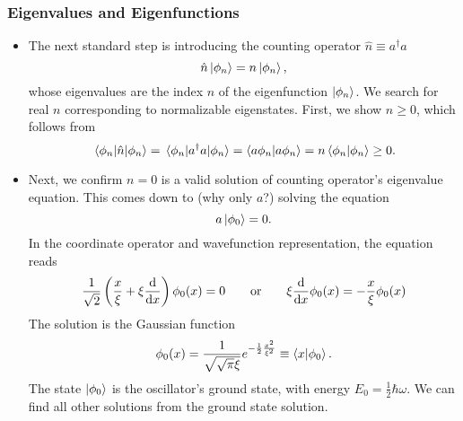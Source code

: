 \documentclass[11pt, a4paper]{article}
\newcommand{\eqtext}[1]{\qquad \text{#1} \qquad}
\renewcommand{\k}[1]{\ket{#1}}
\begin{document}
\subsubsection{Eigenvalues and Eigenfunctions}
\begin{itemize}
	\item The next standard step is introducing the counting operator $ \hat{n} \equiv a^{\dagger}a $
	\begin{equation*}
		\hat{n}\k{\phi_{n}} = n \ket{\phi_{n}},
	\end{equation*}
	whose eigenvalues are the index $ n $ of the eigenfunction $ \ket{\phi_{n}} $. We search for real $ n $ corresponding to normalizable eigenstates. First, we show $ n \geq 0 $, which follows from
	\begin{equation*}
		\mel{\phi_{n}}{\hat{n}}{\phi_{n}} = \mel{\phi_{n}}{a^{\dagger}a}{\phi_{n}} = \braket{a \phi_{n}}{a \phi_{n}} = n \braket{\phi_{n}}{\phi_{n}} \geq 0.
	\end{equation*}
	
	\item Next, we confirm $ n = 0 $ is a valid solution of counting operator's eigenvalue equation. This comes down to (why only $ a $?) solving the equation
	\begin{equation*}
		a \ket{\phi_{0}} = 0.
	\end{equation*}
	In the coordinate operator and wavefunction representation, the equation reads
	\begin{equation*}
		\frac{1}{\sqrt{2}}\left(\frac{x}{\xi} + \xi \dv{x}\right)\phi_{0}(x) = 0 \eqtext{or} \xi \dv{x} \phi_{0}(x) = - \frac{x}{\xi}\phi_{0}(x)
	\end{equation*}
	The solution is the Gaussian function
	\begin{equation*}
		\phi_{0}(x) = \frac{1}{\sqrt{\sqrt{\pi}\xi}}e^{-\frac{1}{2}\frac{x^{2}}{\xi^{2}}} \equiv \braket{x}{\phi_{0}}.
	\end{equation*}
	The state $ \k{\phi_{0}} $ is the oscillator's ground state, with energy $ E_{0} = \frac{1}{2}\hbar \omega $. We can find all other solutions from the ground state solution. 


\end{itemize}
\end{document}
